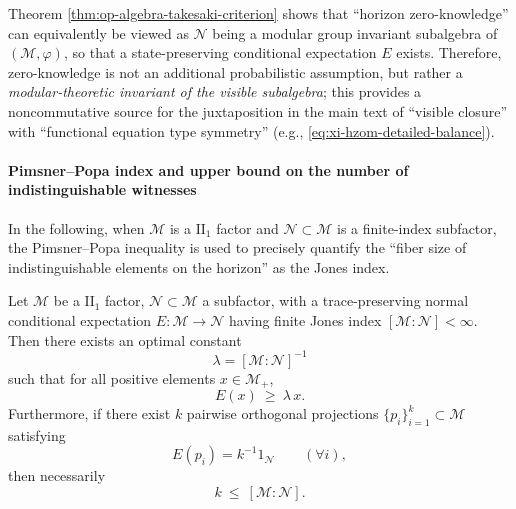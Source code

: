 \begin{remark}\label{rem:op-algebra-zk-as-fixed-subalgebra}
Theorem \ref{thm:op-algebra-takesaki-criterion} shows that ``horizon zero-knowledge'' can equivalently be viewed as
\(\mathcal{N}\) being a modular group invariant subalgebra of \((\mathcal{M},\varphi)\), so that a state-preserving conditional expectation \(E\) exists.
Therefore, zero-knowledge is not an additional probabilistic assumption, but rather a \emph{modular-theoretic invariant of the visible subalgebra};
this provides a noncommutative source for the juxtaposition in the main text of ``visible closure'' with ``functional equation type symmetry'' (e.g., \eqref{eq:xi-hzom-detailed-balance}).
\end{remark}

\paragraph{Pimsner--Popa index and upper bound on the number of indistinguishable witnesses}
In the following, when \(\mathcal{M}\) is a \(\mathrm{II}_1\) factor and \(\mathcal{N}\subset\mathcal{M}\) is a finite-index subfactor,
the Pimsner--Popa inequality is used to precisely quantify the ``fiber size of indistinguishable elements on the horizon'' as the Jones index.

\begin{theorem}\label{thm:op-algebra-pimsner-popa-witness-bound}
Let \(\mathcal{M}\) be a \(\mathrm{II}_1\) factor, \(\mathcal{N}\subset\mathcal{M}\) a subfactor, with a trace-preserving normal conditional expectation \(E:\mathcal{M}\to\mathcal{N}\) having finite Jones index \([\mathcal{M}:\mathcal{N}]<\infty\).
Then there exists an optimal constant
\[
\lambda=[\mathcal{M}:\mathcal{N}]^{-1}
\]
such that for all positive elements \(x\in\mathcal{M}_+\),
\begin{equation}\label{eq:op-algebra-pimsner-popa}
\boxed{\;E(x)\ \ge\ \lambda\,x.\;}
\end{equation}
Furthermore, if there exist \(k\) pairwise orthogonal projections \(\{p_i\}_{i=1}^k\subset\mathcal{M}\) satisfying
\begin{equation}\label{eq:op-algebra-indist-projections}
\boxed{\;E(p_i)=k^{-1}1_{\mathcal{N}}\qquad(\forall i),\;}
\end{equation}
then necessarily
\begin{equation}\label{eq:op-algebra-k-index-bound}
\boxed{\;k\ \le\ [\mathcal{M}:\mathcal{N}].\;}
\end{equation}
\end{theorem}

